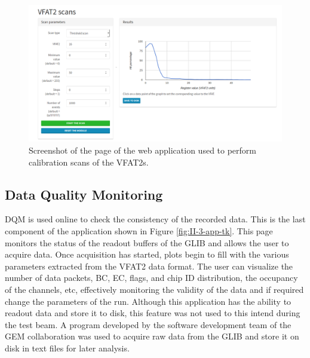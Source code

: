       \begin{figure}[h!]
        \centering
        \includegraphics[width=\textwidth]{img/II-3-test-beam/app-scan.png}
        \caption{Screenshot of the page of the web application used to perform calibration scans of the VFAT2s.}
        \label{fig:II-3-app-calibration}
      \end{figure}

    \subsection{Data Quality Monitoring}

      DQM is used online to check the consistency of the recorded data. This is the last component of the application shown in Figure \ref{fig:II-3-app-tk}. This page monitors the status of the readout buffers of the GLIB and allows the user to acquire data. Once acquisition has started, plots begin to fill with the various parameters extracted from the VFAT2 data format. The user can visualize the number of data packets, BC, EC, flags, and chip ID distribution, the occupancy of the channels, etc, effectively monitoring the validity of the data and if required change the parameters of the run. Although this application has the ability to readout data and store it to disk, this feature was not used to this intend during the test beam. A program developed by the software development team of the GEM collaboration was used to acquire raw data from the GLIB and store it on disk in text files for later analysis.

